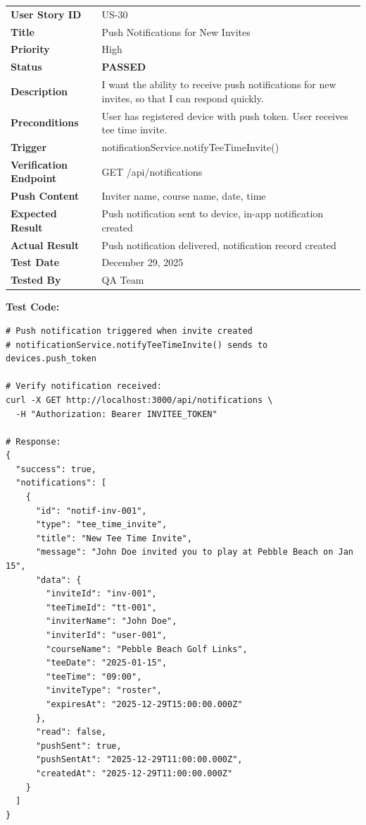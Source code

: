 \documentclass[11pt,a4paper]{article}
\newcommand{\passed}{\textcolor{pass}{\textbf{PASSED}}}
\begin{document}
\begin{tabularx}{\textwidth}{|p{3.2cm}|Y|}
\hline
{}
 \\
\hline
\textbf{User Story ID} & US-30 \\
\hline
\textbf{Title} & Push Notifications for New Invites \\
\hline
\textbf{Priority} & High \\
\hline
\textbf{Status} & \passed \\
\hline
\textbf{Description} & I want the ability to receive push notifications for new invites, so that I can respond quickly. \\
\hline
\textbf{Preconditions} & User has registered device with push token. User receives tee time invite. \\
\hline
\textbf{Trigger} & notificationService.notifyTeeTimeInvite() \\
\hline
\textbf{Verification Endpoint} & GET /api/notifications \\
\hline
\textbf{Push Content} & Inviter name, course name, date, time \\
\hline
\textbf{Expected Result} & Push notification sent to device, in-app notification created \\
\hline
\textbf{Actual Result} & Push notification delivered, notification record created \\
\hline
\textbf{Test Date} & December 29, 2025 \\
\hline
\textbf{Tested By} & QA Team \\
\hline
\end{tabularx}

\vspace{0.3cm}
\textbf{Test Code:}
\begin{lstlisting}
# Push notification triggered when invite created
# notificationService.notifyTeeTimeInvite() sends to devices.push_token

# Verify notification received:
curl -X GET http://localhost:3000/api/notifications \
  -H "Authorization: Bearer INVITEE_TOKEN"

# Response:
{
  "success": true,
  "notifications": [
    {
      "id": "notif-inv-001",
      "type": "tee_time_invite",
      "title": "New Tee Time Invite",
      "message": "John Doe invited you to play at Pebble Beach on Jan 15",
      "data": {
        "inviteId": "inv-001",
        "teeTimeId": "tt-001",
        "inviterName": "John Doe",
        "inviterId": "user-001",
        "courseName": "Pebble Beach Golf Links",
        "teeDate": "2025-01-15",
        "teeTime": "09:00",
        "inviteType": "roster",
        "expiresAt": "2025-12-29T15:00:00.000Z"
      },
      "read": false,
      "pushSent": true,
      "pushSentAt": "2025-12-29T11:00:00.000Z",
      "createdAt": "2025-12-29T11:00:00.000Z"
    }
  ]
}
\end{lstlisting}
\end{document}
